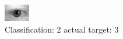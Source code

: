 \begin{figure}[h!]
\begin{center}
\includegraphics[width=0.60\columnwidth]{figures/ID648_class_2_target_3.png}
\end{center}
\caption{ Classification: 2 actual target: 3}
\label{fig:ID648_class_2_target_3}
\end{figure}

